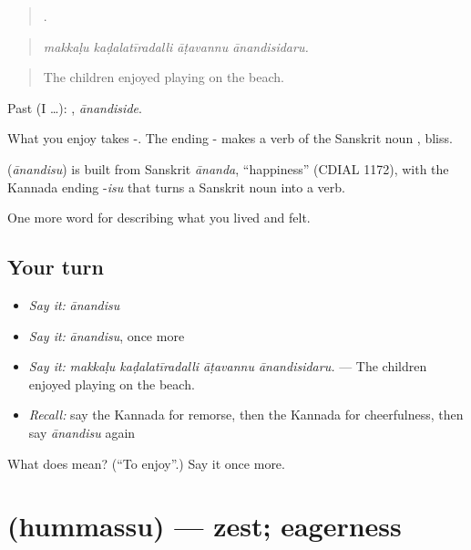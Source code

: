 \begin{quote}
   .
\end{quote}

\begin{quote}
\emph{makkaḷu kaḍalatīradalli āṭavannu ānandisidaru.}
\end{quote}

\begin{quote}
The children enjoyed playing on the beach.
\end{quote}

Past (I …): , \emph{ānandiside}.

What you enjoy takes -. The ending - makes a verb of the Sanskrit noun , bliss.

\begin{cousinweb}
\textbf{} (\emph{ānandisu}) is built from Sanskrit \emph{ānanda}, \textquotedblleft{}happiness\textquotedblright{} (CDIAL 1172), with the Kannada ending -\emph{isu} that turns a Sanskrit noun into a verb.
\end{cousinweb}

\begin{grammarlens}[title={What you've built}]
One more word for describing what you lived and felt.
\end{grammarlens}

\subsection*{Your turn}
\begin{itemize}
\raggedright
  \item \emph{Say it:} \emph{ānandisu}
  \item \emph{Say it:} \emph{ānandisu}, once more
  \item \emph{Say it:} \emph{makkaḷu kaḍalatīradalli āṭavannu ānandisidaru.} — The children enjoyed playing on the beach.
  \item \emph{Recall:} say the Kannada for remorse, then the Kannada for cheerfulness, then say \emph{ānandisu} again
\end{itemize}

\begin{tcolorbox}[breakable,colback=teal!4,colframe=teal!35!black,title={Before you move on}]
What does  mean? (\textquotedblleft{}To enjoy\textquotedblright{}.) Say it once more.
\end{tcolorbox}
\section[\texorpdfstring{\kn{ಹುಮ್ಮಸ್ಸು} (hummassu)}{ಹುಮ್ಮಸ್ಸು (hummassu)}]{ (hummassu) — zest; eagerness}

